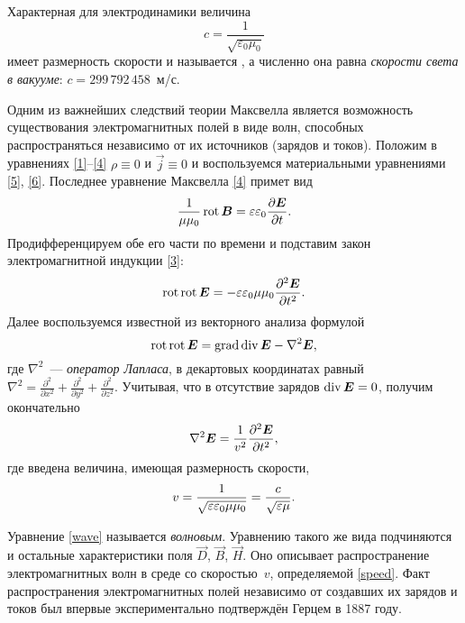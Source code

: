 Характерная для электродинамики величина
\[
c=\frac{1}{\sqrt{\varepsilon_0\mu_0}}
\]
имеет размерность скорости и называется , 
а численно она равна \emph{скорости света в вакууме}: $c=299\,792\,458$~м/с.

\label{sec:emwaves}

Одним из важнейших следствий теории Максвелла является возможность 
существования электромагнитных полей в виде волн, способных 
распространяться независимо от их источников (зарядов и токов).
Положим в уравнениях \eqref{1}--\eqref{4} $\rho\equiv 0$ и $\vec{j}\equiv 0$
и воспользуемся материальными уравнениями \eqref{5}, \eqref{6}.
Последнее уравнение Максвелла \eqref{4} примет вид
\[
\frac{1}{\mu \mu_0} \mathop{\mathrm{rot}} {\boldsymbol{B}} =  \varepsilon \varepsilon_0 \frac{\partial {\boldsymbol{E}}}{\partial t}.
\]
Продифференцируем обе его части по времени и подставим закон электромагнитной индукции \eqref{3}:
\[
\mathop{\mathrm{rot}}\mathop{\mathrm{rot}} {\boldsymbol{E}} = -\varepsilon\varepsilon_0 \mu\mu_0 \frac{\partial^2 {\boldsymbol{E}}}{\partial t^2}.
\]
Далее воспользуемся известной из векторного анализа формулой
\begin{equation} \eqmark{rotrot}
\Rot\Rot\vec{E}=\Grad\Div\vec{E}-\nabla^2\vec{E},
\end{equation}
где $\nabla^2$~--- \emph{оператор Лапласа}, в декартовых координатах равный
$\nabla^2 = \frac{\partial^2}{\partial x^2} + 
\frac{\partial^2}{\partial y^2}+
\frac{\partial^2}{\partial z^2}$.
Учитывая, что в отсутствие зарядов $\mathop{\mathrm{div}}{\boldsymbol{E}}=0$, получим окончательно
\begin{equation} \eqmark{wave}
\nabla^2\vec{E}=\frac{1}{v^2} \frac{\partial^2 \vec{E}}{\partial t^2},
\end{equation}
где введена величина, имеющая размерность скорости,
\begin{equation}\eqmark{speed}
v = \frac{1}{\sqrt{\varepsilon\varepsilon_0 \mu \mu_0}}= \frac{c}{\sqrt{\varepsilon\mu}}.
\end{equation}

Уравнение \eqref{wave} называется \emph{волновым}. Уравнению такого же вида 
подчиняются и остальные характеристики поля $\vec{D}$, $\vec{B}$, $\vec{H}$. 
Оно описывает распространение электромагнитных волн в среде со скоростью~$v$,
определяемой \eqref{speed}. Факт распространения электромагнитных полей независимо
от создавших их зарядов и токов был впервые экспериментально подтверждён
Герцем в 1887 году.


